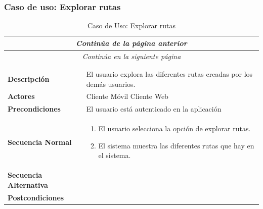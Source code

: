\newpage
\subsubsection*{Caso de uso: Explorar rutas}
\begin{longtable}{| p{4cm} | p{10cm} |}
\endfirsthead
\multicolumn{2}{c}{\textit{Continúa de la página anterior}}\\[12pt]
\hline
\endhead
\hline
\multicolumn{2}{c}{\textit{Continúa en la siguiente página}} \\
\endfoot
\hline
\caption{Caso de Uso: Explorar rutas}\label{fig:1}\\
\endlastfoot


\hline
\multicolumn{2}{|c|}{\textbf{CU$<$04$>$ - Explorar Rutas}} \\

\hline
\textbf{Descripción} &
El usuario explora las diferentes rutas creadas por los demás usuarios.\\

\hline
\textbf{Actores} &
Cliente Móvil\newline
Cliente Web\\

\hline
\textbf{Precondiciones} &
El usuario está autenticado en la aplicación\\

\hline
\textbf{Secuencia Normal} &\mbox{}\par\vspace{-\baselineskip}
\begin{enumerate}[leftmargin=0.7cm, topsep=0.1cm]
\item El usuario selecciona la opción de explorar rutas.
\item El sistema muestra las diferentes rutas que hay en el sistema.
\end{enumerate}\\

\hline
\textbf{Secuencia Alternativa} &\mbox{}\par\vspace{-\baselineskip}
\\

\hline
\textbf{Postcondiciones} & 
\\
\hline
\end{longtable}



\newpage
